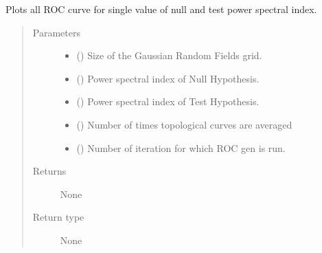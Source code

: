 \documentclass[letterpaper,10pt,english]{sphinxmanual}
\begin{document}

\begin{fulllineitems}
\label{\detokenize{testsFunc:testsFunc.testAllROC}}
\sphinxAtStartPar
Plots all ROC curve for single value of null and test power spectral index.
\begin{quote}\begin{description}
\item[{Parameters}] \leavevmode\begin{itemize}
\item {} 
\sphinxAtStartPar
{} () \textendash{} Size of the Gaussian Random Fields grid.

\item {} 
\sphinxAtStartPar
{} () \textendash{} Power spectral index of Null Hypothesis.

\item {} 
\sphinxAtStartPar
{} () \textendash{} Power spectral index of Test Hypothesis.

\item {} 
\sphinxAtStartPar
{} () \textendash{} Number of times topological curves are averaged

\item {} 
\sphinxAtStartPar
{} () \textendash{} Number of iteration for which ROC gen is run.

\end{itemize}

\item[{Returns}] \leavevmode
\sphinxAtStartPar
None

\item[{Return type}] \leavevmode
\sphinxAtStartPar
None

\end{description}\end{quote}

\end{fulllineitems}
\end{document}
